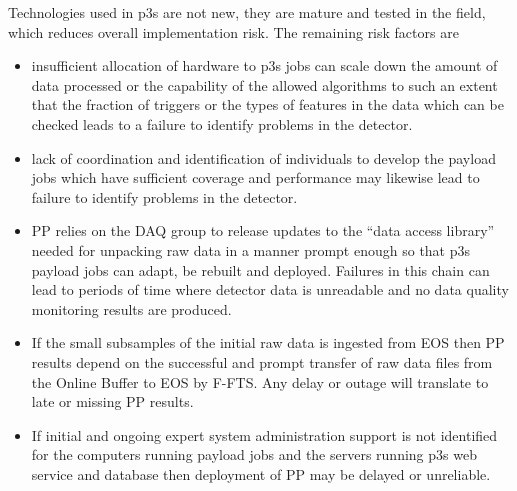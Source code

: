 \documentclass[pdftex,12pt,letter]{article}
\begin{document}
Technologies used in p3s are not new, they are mature and tested in the field, which reduces
overall implementation risk. The remaining risk factors are
\begin{itemize}

\item insufficient allocation of hardware to p3s jobs can scale down
  the amount of data processed or the capability of the allowed
  algorithms to such an extent that the fraction of triggers or the
  types of features in the data which can be checked leads to a
  failure to identify problems in the detector.

\item lack of coordination and identification of individuals to
  develop the payload jobs which have sufficient coverage and
  performance may likewise lead to failure to identify problems in the
  detector.


\item PP relies on the DAQ group to release updates to the ``data
  access library'' needed for unpacking raw data in a manner prompt
  enough so that p3s payload jobs can adapt, be rebuilt and deployed.
  Failures in this chain can lead to periods of time where detector
  data is unreadable and no data quality monitoring results are
  produced.

\item If the small subsamples of the initial raw data is ingested from
  EOS then PP results depend on the successful and prompt transfer of
  raw data files from the Online Buffer to EOS by F-FTS.  Any delay or
  outage will translate to late or missing PP results.

\item If initial and ongoing expert system administration support is
  not identified for the computers running payload jobs and the
  servers running p3s web service and database then deployment of PP
  may be delayed or unreliable.

\end{itemize}
\end{document}
